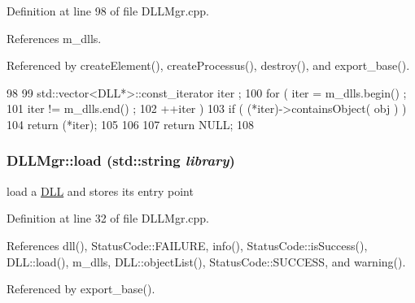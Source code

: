 Definition at line 98 of file DLLMgr.cpp.

References m\_\-dlls.

Referenced by createElement(), createProcessus(), destroy(), and export\_\-base().


\begin{DoxyCode}
98                                              {
99   std::vector<DLL*>::const_iterator iter ;
100   for ( iter = m_dlls.begin() ; 
101         iter != m_dlls.end()  ; 
102         ++iter ) {
103     if ( (*iter)->containsObject( obj ) ){
104       return (*iter);
105     }
106   }
107   return NULL;
108 }
\end{DoxyCode}
\hypertarget{classDLLMgr_a3c92bec62ace09dd00959c31bb2475d6}{
\subsubsection[{load}]{ DLLMgr::load (std::string {\em library})}}
\label{classDLLMgr_a3c92bec62ace09dd00959c31bb2475d6}
load a \hyperlink{classDLL}{DLL} and stores its entry point 

Definition at line 32 of file DLLMgr.cpp.

References dll(), StatusCode::FAILURE, info(), StatusCode::isSuccess(), DLL::load(), m\_\-dlls, DLL::objectList(), StatusCode::SUCCESS, and warning().

Referenced by export\_\-base().


